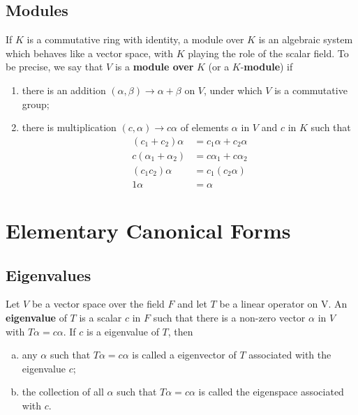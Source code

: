 \documentclass[main.tex]{subfiles}
\begin{document}
\section{Modules}
\begin{definition}
If $K$ is a commutative ring with identity, a module over $K$ is an algebraic system which behaves like a vector space, with $K$ playing the role of the scalar field. To be precise, we say that $V$ is a \textbf{module over} $K$ (or a $K$-\textbf{module}) if 
\begin{enumerate}
    \item there is an addition $(\alpha, \beta) \rightarrow \alpha + \beta$ on $V$, under which $V$ is a commutative group;
    \item there is multiplication $(c, \alpha) \rightarrow c\alpha$ of elements $\alpha$ in $V$ and $c$ in $K$ such that
    \begin{align*}
        (c_1 + c_2) \alpha &= c_1 \alpha + c_2 \alpha\\
        c(\alpha_1 + \alpha_2) &= c\alpha_1 + c\alpha_2\\
        (c_1 c_2)\alpha &= c_1(c_2 \alpha)\\
        1 \alpha &= \alpha
    \end{align*}
\end{enumerate}
\end{definition}
\chapter{Elementary Canonical Forms}
\section{Eigenvalues}
\begin{definition}
    Let $V$ be a vector space over the field $F$ and let $T$ be a linear operator on V. An \textbf{eigenvalue} of $T$ is a scalar $c$ in $F$ such that there is a non-zero vector $\alpha$ in $V$ with $T \alpha=c \alpha$. If $c$ is a  eigenvalue of $T$, then
    \begin{enumerate}[(a)]
        \item any $\alpha$ such that $T \alpha=c \alpha$ is called a eigenvector of $T$ associated with the eigenvalue $c$;
        \item the collection of all $\alpha$ such that $T \alpha=c \alpha$ is called the eigenspace associated with $c$.
    \end{enumerate}


\end{definition}
\end{document}

